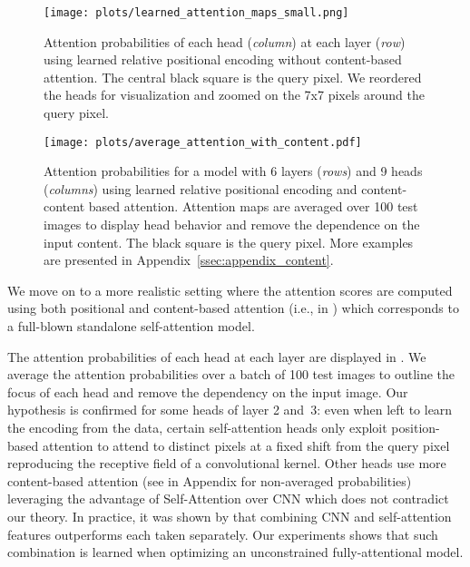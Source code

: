 \documentclass{article} \usepackage{iclr2020_conference,times}
\begin{document}
\begin{figure}
\RawFloats
\centering
  \texttt{[image: plots/learned\_attention\_maps\_small.png]}
  \caption{Attention probabilities of each head (\emph{column}) at each layer (\emph{row}) using learned relative positional encoding without content-based attention. The central black square is the query pixel. We reordered the heads for visualization and zoomed on the 7x7 pixels around the query pixel.
  \vspace{-3mm}}
  \label{fig:learned_attention_map}

\vspace*{\floatsep}
\vspace*{\floatsep}
\vspace*{\floatsep}

  \texttt{[image: plots/average\_attention\_with\_content.pdf]}
  \caption{Attention probabilities for a model with 6 layers (\emph{rows}) and 9 heads (\emph{columns}) using learned relative positional encoding and content-content based attention.
  Attention maps are averaged over 100 test images to display head behavior and remove the dependence on the input content.
  The black square is the query pixel.
  More examples are presented in Appendix~\ref{ssec:appendix_content}.
  \vspace{-5mm}}
  \label{fig:learned_attention_map_data}
\end{figure}



We move on to a more realistic setting where the attention scores are computed using both positional and content-based attention (i.e.,  in \citep{ramachandran2019standaloneselfattention}) which corresponds to a full-blown standalone self-attention model.

The attention probabilities of each head at each layer are displayed in .
We average the attention probabilities over a batch of 100 test images to outline the focus of each head and remove the dependency on the input image.
Our hypothesis is confirmed for some heads of layer 2 and~3: even when left to learn the encoding from the data, certain self-attention heads only exploit position-based attention to attend to distinct pixels at a fixed shift from the query pixel reproducing the receptive field of a convolutional kernel.
Other heads use more content-based attention (see  in Appendix for non-averaged probabilities) leveraging the advantage of Self-Attention over CNN which does not contradict our theory.
In practice, it was shown by \cite{belloAttentionAugmentedConvolutional2019} that combining CNN and self-attention features outperforms each taken separately.
Our experiments shows that such combination is learned when optimizing an unconstrained fully-attentional model.
\end{document}
